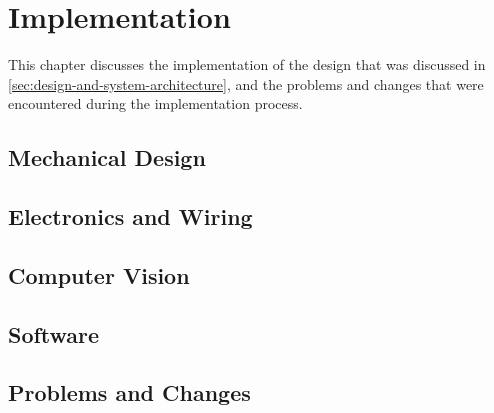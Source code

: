 \section{Implementation}
\label{sec:implementation}

This chapter discusses the implementation of the design that was discussed in \autoref{sec:design-and-system-architecture}, and the problems and changes that were encountered during the implementation process.

\subsection{Mechanical Design}
\label{sec:implementation-mechanical-design}


\subsection{Electronics and Wiring}
\label{sec:electronics}


\subsection{Computer Vision}
\label{sec:computer-vision}
  

\subsection{Software}
\label{sec:software}


\subsection{Problems and Changes}
\label{sec:implementation-problems-and-changes}
